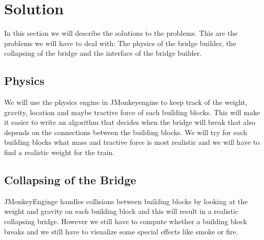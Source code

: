 \section{Solution}
In this section we will describe the solutions to the problems. This are the problems we will have to deal with: The physics of the bridge builder, the collapsing of the bridge and  the interface of the bridge builder.
\subsection{Physics}
We will use the physics engine in JMonkeyengine to keep track of the weight, gravity, location and maybe tractive force of each building blocks. This will make it easier to write an algorithm that decides when the bridge will break that also depends on the connections between the building blocks. We will try for each building blocks what mass and tractive force is most realistic and we will have to find a realistic weight for the train. 
\subsection{Collapsing of the Bridge}
JMonkeyEnginge handles collisions between building blocks by looking at the weight and gravity on each building block and this will result in a realistic collapsing bridge. However we still have to compute whether a building block breaks and we still have to visualize some special effects like smoke or fire.
